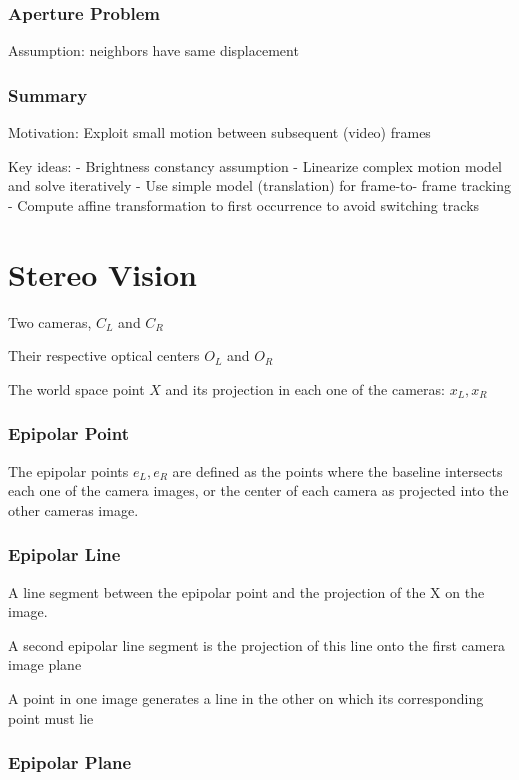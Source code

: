 \subsubsection{Aperture Problem}

Assumption: neighbors have same displacement

\subsubsection{Summary}
Motivation: Exploit small motion between subsequent (video) frames

Key ideas:
- Brightness constancy assumption
- Linearize complex motion model and solve iteratively
- Use simple model (translation) for frame-to- frame tracking
- Compute affine transformation to first occurrence to avoid switching tracks


\section{Stereo Vision}

Two cameras, $C_L$ and $C_R$

Their respective optical centers $O_L$ and $O_R$

The world space point $X$ and its projection in each one of the cameras: $x_L, x_R$

\subsubsection{Epipolar Point}

The epipolar points $e_L, e_R$ are defined as the points where the baseline intersects each one of the camera images, or the center of each camera as projected into the other cameras image.

\subsubsection{Epipolar Line}

A line segment between the epipolar point and the projection of the X on the image.

A second epipolar line segment is the projection of this line onto the first camera image plane

A point in one image generates a line in the other on which its corresponding point must lie

\subsubsection{Epipolar Plane}

